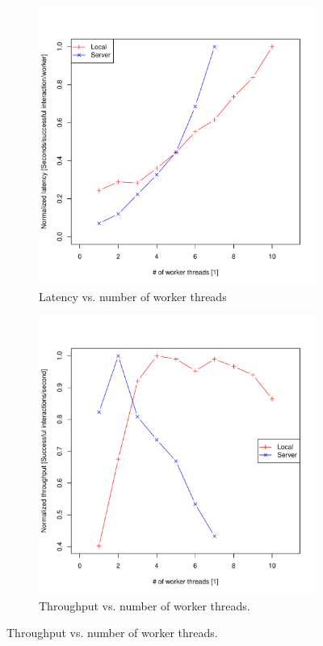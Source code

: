 \documentclass[12pt]{article}
\begin{document}
\begin{figure}[htbp]
\begin{subfigure}[t]{0.5\textwidth}
\centering
\includegraphics[scale=0.4]{latency.pdf}
\caption{Latency vs. number of worker threads}
\end{subfigure}
\begin{subfigure}[t]{0.5\textwidth}
\centering
\includegraphics[scale=0.4]{throughput.pdf}
\caption{Throughput vs. number of worker threads.}
\end{subfigure}
\end{figure}
\end{document}
